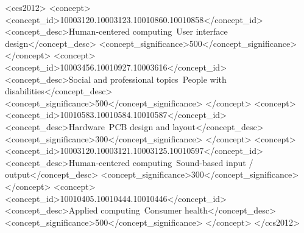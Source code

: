 \documentclass[manuscript,screen]{acmart}
\begin{document}

\begin{CCSXML}
  <ccs2012>
     <concept>
         <concept_id>10003120.10003123.10010860.10010858</concept_id>
         <concept_desc>Human-centered computing~User interface design</concept_desc>
         <concept_significance>500</concept_significance>
         </concept>
     <concept>
         <concept_id>10003456.10010927.10003616</concept_id>
         <concept_desc>Social and professional topics~People with disabilities</concept_desc>
         <concept_significance>500</concept_significance>
         </concept>
     <concept>
         <concept_id>10010583.10010584.10010587</concept_id>
         <concept_desc>Hardware~PCB design and layout</concept_desc>
         <concept_significance>300</concept_significance>
         </concept>
     <concept>
         <concept_id>10003120.10003121.10003125.10010597</concept_id>
         <concept_desc>Human-centered computing~Sound-based input / output</concept_desc>
         <concept_significance>300</concept_significance>
         </concept>
     <concept>
         <concept_id>10010405.10010444.10010446</concept_id>
         <concept_desc>Applied computing~Consumer health</concept_desc>
         <concept_significance>500</concept_significance>
         </concept>
   </ccs2012>
\end{CCSXML}

\end{document}
